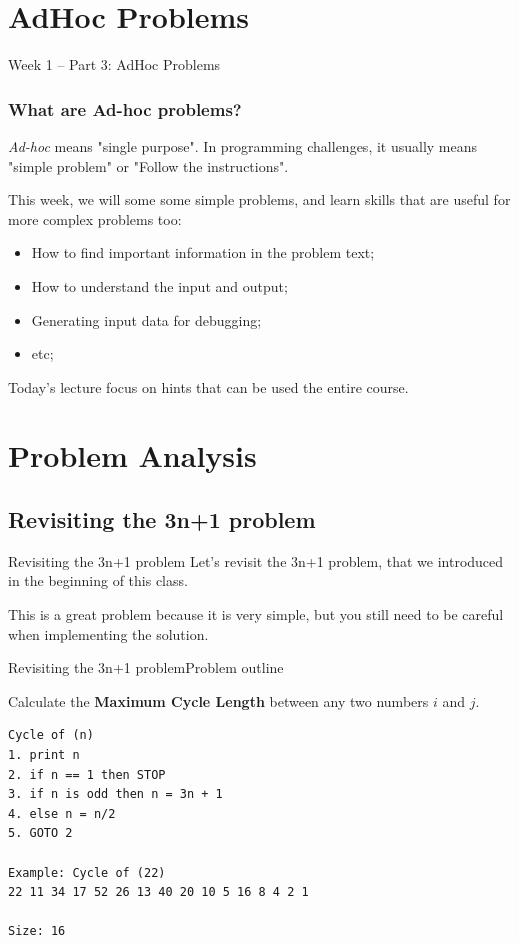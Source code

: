 

\section{AdHoc Problems}

\begin{frame}
  \centering
  {\huge
    Week 1 -- Part 3: AdHoc Problems
  }
\end{frame}

\begin{frame}
  \frametitle{What are Ad-hoc problems?}

  \emph{Ad-hoc} means "single purpose". In programming challenges, it usually means "simple problem" or "Follow the instructions".
  \bigskip

  This week, we will some some simple problems, and learn skills that are useful
  for more complex problems too:
  \bigskip

  \begin{itemize}
    \item How to find important information in the problem text;
    \item How to understand the input and output;
    \item Generating input data for debugging;
    \item etc;
  \end{itemize}
  \bigskip

  Today's lecture focus on hints that can be used the entire course.
\end{frame}

\section{Problem Analysis}
\subsection{Revisiting the 3n+1 problem}
\begin{frame}{Revisiting the 3n+1 problem}
  Let's revisit the 3n+1 problem, that we introduced in the beginning of this class.
  \bigskip

  This is a great problem because it is very simple, but you still need to be careful when implementing the solution.
\end{frame}

\begin{frame}[fragile]{Revisiting the 3n+1 problem}{Problem outline}

  \begin{block}{}
    Calculate the {\bf Maximum Cycle Length} between any two numbers $i$ and $j$.
  \end{block}
  \bigskip

\begin{verbatim}
Cycle of (n)
1. print n
2. if n == 1 then STOP
3. if n is odd then n = 3n + 1
4. else n = n/2
5. GOTO 2

Example: Cycle of (22)
22 11 34 17 52 26 13 40 20 10 5 16 8 4 2 1

Size: 16
\end{verbatim}
\end{frame}

